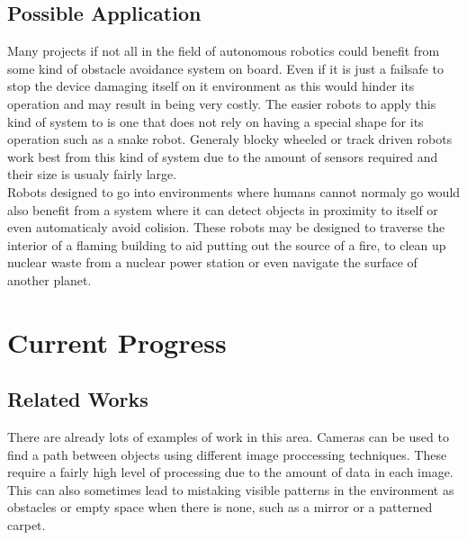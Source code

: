\documentclass[11pt,fleqn,twoside]{article}
\begin{document}
\subsection{Possible Application}
Many projects if not all in the field of autonomous robotics could benefit from some kind of obstacle avoidance system on board.  Even if it is just a failsafe to stop the device damaging itself on it environment as this would hinder its operation and may result in being very costly.  The easier robots to apply this kind of system to is one that does not rely on having a special shape for its operation \cite{snake} such as a snake robot.  Generaly blocky wheeled or track driven robots work best from this kind of system due to the amount of sensors required and their size is usualy fairly large.
\\Robots designed to go into environments where humans cannot normaly go would also benefit from a system where it can detect objects in proximity to itself or even automaticaly avoid colision.  These robots may be designed to traverse the interior of a flaming building to aid putting out the source of a fire, to clean up nuclear waste from a nuclear power station or even navigate the surface of another planet.
\section{Current Progress}
\subsection{Related Works}
There are already lots of examples of work in this area.  Cameras can be used to find a path between objects using different image proccessing techniques.  These require a fairly high level of processing due to the amount of data in each image.  This can also sometimes lead to mistaking visible patterns in the environment as obstacles or empty space when there is none, such as a mirror or a patterned carpet.
\cite{roborealm}
\end{document}
